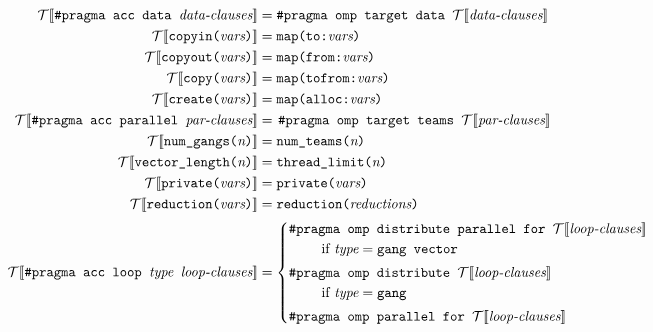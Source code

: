 \documentclass{sig-alternate-05-2015}
\begin{document}
\newcommand{\translate}[1]{\ensuremath{\mathcal{T}[\![ #1 ]\!]}}
\begin{figure*}
\begin{align*}
%
\translate{\texttt{\#pragma acc data\ }\textit{data-clauses}} &=
   \texttt{\#pragma omp target data } \translate{\textit{data-clauses}} \\
%
\translate{\texttt{copyin(}\textit{vars}\texttt{)}} &=
   \texttt{map(to:}\textit{vars}\texttt{)} \\
%
\translate{\texttt{copyout(}\textit{vars}\texttt{)}} &=
   \texttt{map(from:}\textit{vars}\texttt{)} \\
%
\translate{\texttt{copy(}\textit{vars}\texttt{)}} &=
   \texttt{map(tofrom:}\textit{vars}\texttt{)} \\
%
\translate{\texttt{create(}\textit{vars}\texttt{)}} &=
   \texttt{map(alloc:}\textit{vars}\texttt{)} \\
%
\translate{\texttt{\#pragma acc parallel\ }\textit{par-clauses}} &=
   \left.\parbox[t]{4in}{%
   \texttt{\#pragma omp target teams\ }\translate{\textit{par-clauses}}}\right. \\
%
\translate{\texttt{num\_gangs(}\textit{n}\texttt{)}} &=
   \texttt{num\_teams(}\textit{n}\texttt{)} \\
%
\translate{\texttt{vector\_length(}\textit{n}\texttt{)}} &=
   \texttt{thread\_limit(}\textit{n}\texttt{)} \\
%
\translate{\texttt{private(}\textit{vars}\texttt{)}} &=
   \texttt{private(}\textit{vars}\texttt{)} \\
%
\translate{\texttt{reduction(}\textit{vars}\texttt{)}} &=
   \texttt{reduction(}\textit{reductions}\texttt{)} \\
%
\translate{\texttt{\#pragma acc loop\ }\textit{type}\texttt{\ }\textit{loop-clauses}} &=
   \begin{cases}
   \texttt{\#pragma omp distribute parallel for\ }\translate{\textit{loop-clauses}} \\
        \hspace*{2em} \textup{ if $\textit{type} = \texttt{gang vector}$} \vspace*{.25em} \\
   \texttt{\#pragma omp distribute\ }\translate{\textit{loop-clauses}} \\
        \hspace*{2em} \textup{ if $\textit{type} = \texttt{gang}$} \vspace*{.25em} \\
   \texttt{\#pragma omp parallel for\ }\translate{\textit{loop-clauses}} \\

\end{cases}
\end{align*}
\end{figure*}
\end{document}
